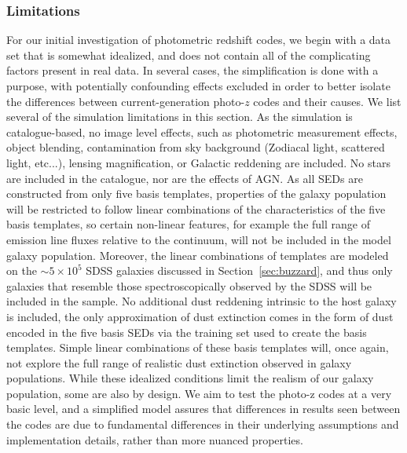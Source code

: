 \subsubsection{Limitations}
\label{sec:buzzlimitations}
For our initial investigation of photometric redshift codes, we begin with a data set that is somewhat idealized, and does not contain all of the complicating factors present in real data.  In several cases, the simplification is done with a purpose, with potentially confounding effects excluded in order to better isolate the differences between current-generation photo-$z$ codes and their causes.  We list several of the simulation limitations in this section.
As the simulation is catalogue-based, no image level effects, such as photometric measurement effects, object blending, contamination from sky background (Zodiacal light, scattered light, etc...), lensing magnification, or Galactic reddening are included.  No stars are included in the catalogue, nor are the effects of AGN.
As all SEDs are constructed from only five basis templates, properties of the galaxy population will be restricted to follow linear combinations of the characteristics of the five basis templates, so certain non-linear features, for example the full range of emission line fluxes relative to the continuum, will not be included in the model galaxy population.  Moreover, the linear combinations of templates are modeled on the $\sim5\times 10^{5}$ SDSS galaxies discussed in Section~\ref{sec:buzzard}, and thus only galaxies that resemble those spectroscopically observed by the SDSS will be included in the sample.  No additional dust reddening intrinsic to the host galaxy is included, the only approximation of dust extinction comes in the form of dust encoded in the five basis SEDs via the training set used to create the basis templates.  Simple linear combinations of these basis templates will, once again, not explore the full range of realistic dust extinction observed in galaxy populations.
While these idealized conditions limit the realism of our galaxy population, some are also by design.  We aim to test the photo-z codes at a very basic level, and a simplified model assures that differences in results seen between the codes are due to fundamental differences in their underlying assumptions and implementation details, rather than more nuanced properties.  

